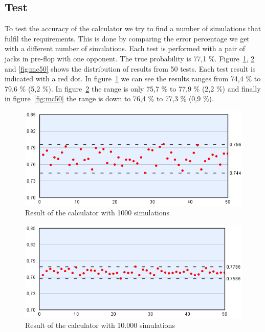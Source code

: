 \subsection{Test}
To test the accuracy of the calculator we try to find a number of simulations that fulfil the requirements. This is done by comparing the error percentage we get with a different number of simulations. Each test is performed with a pair of jacks in pre-flop with one opponent. The true probability is 77,1 \%. Figure~\ref{fig:mc1}, \ref{fig:mc10} and \ref{fig:mc50} shows the distribution of results from 50 tests. Each test result is indicated with a red dot. In figure~\ref{fig:mc1} we can see the results ranges from 74,4 \% to 79,6 \% (5,2 \%). In figure~\ref{fig:mc10} the range is only 75,7 \% to 77,9 \% (2,2 \%) and finally in figure~\ref{fig:mc50} the range is down to 76,4 \% to 77,3 \% (0,9 \%).


\begin{figure}[H]
  \center
    \includegraphics[scale=0.775]{images/MonteCarlo/1k.png}
  \caption{Result of the calculator with 1000 simulations \label{fig:mc1}}
\end{figure}

\begin{figure}[H]
  \center
    \includegraphics[scale=0.775]{images/MonteCarlo/10k.png}
  \caption{Result of the calculator with 10.000 simulations \label{fig:mc10}}
\end{figure}

